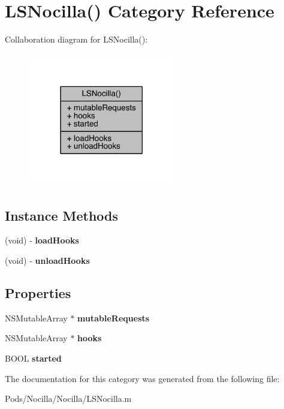 \hypertarget{category_l_s_nocilla_07_08}{\section{L\-S\-Nocilla() Category Reference}
\label{category_l_s_nocilla_07_08}
}


Collaboration diagram for L\-S\-Nocilla()\-:\nopagebreak
\begin{figure}[H]
\begin{center}
\leavevmode
\includegraphics[width=182pt]{category_l_s_nocilla_07_08__coll__graph}
\end{center}
\end{figure}
\subsection*{Instance Methods}
\begin{DoxyCompactItemize}
\item 
\hypertarget{category_l_s_nocilla_07_08_afe30b5a44e4851eb4b5f563ce369115c}{(void) -\/ {\bfseries load\-Hooks}}\label{category_l_s_nocilla_07_08_afe30b5a44e4851eb4b5f563ce369115c}

\item 
\hypertarget{category_l_s_nocilla_07_08_a97295d379507c597ac16e18d75d2951d}{(void) -\/ {\bfseries unload\-Hooks}}\label{category_l_s_nocilla_07_08_a97295d379507c597ac16e18d75d2951d}

\end{DoxyCompactItemize}
\subsection*{Properties}
\begin{DoxyCompactItemize}
\item 
\hypertarget{category_l_s_nocilla_07_08_a5a0a17bf0b92ec3ff3f64dfa7b8c1cdb}{N\-S\-Mutable\-Array $\ast$ {\bfseries mutable\-Requests}}\label{category_l_s_nocilla_07_08_a5a0a17bf0b92ec3ff3f64dfa7b8c1cdb}

\item 
\hypertarget{category_l_s_nocilla_07_08_abb167d97a7161835d1b2dda37f3368ed}{N\-S\-Mutable\-Array $\ast$ {\bfseries hooks}}\label{category_l_s_nocilla_07_08_abb167d97a7161835d1b2dda37f3368ed}

\item 
\hypertarget{category_l_s_nocilla_07_08_ad6b88e31ea445a469d4e7747e76d44e4}{B\-O\-O\-L {\bfseries started}}\label{category_l_s_nocilla_07_08_ad6b88e31ea445a469d4e7747e76d44e4}

\end{DoxyCompactItemize}


The documentation for this category was generated from the following file\-:\begin{DoxyCompactItemize}
\item 
Pods/\-Nocilla/\-Nocilla/L\-S\-Nocilla.\-m\end{DoxyCompactItemize}

